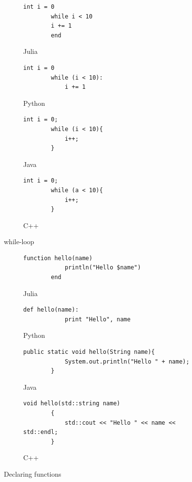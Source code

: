 \documentclass[a4paper, 11pt, titlepage]{article}
\begin{document}
\begin{figure}[H]
	\centering
	\begin{subfigure}[H]{0.7\textwidth}
		\centering
		\begin{lstlisting}[belowskip=0.5mm]
		int i = 0
		while i < 10
		i += 1
		end
		\end{lstlisting}
		\caption{Julia}
	\end{subfigure}
	\begin{subfigure}[H]{0.7\textwidth}
		\centering
		\begin{lstlisting}[belowskip=0.5mm]
		int i = 0
		while (i < 10):
			i += 1
		\end{lstlisting}
		\caption{Python}
	\end{subfigure}	
	\begin{subfigure}[H]{0.7\textwidth}
		\centering
		\begin{lstlisting}[belowskip=0.5mm]
		int i = 0;
		while (i < 10){
			i++;
		}
		\end{lstlisting}
		\caption{Java}
	\end{subfigure}
	\begin{subfigure}[H]{0.7\textwidth}
		\centering
		\begin{lstlisting}[belowskip=0.5mm]
		int i = 0;
		while (a < 10){
			i++;
		}
		\end{lstlisting}
		\caption{C++}
	\end{subfigure}
	\caption{while-loop}
	\label{whileloop}
\end{figure}

\begin{figure}[H]
	\centering
	\begin{subfigure}[H]{0.7\textwidth}
		\centering
		\begin{lstlisting}[belowskip=0.5mm]
		function hello(name)
			println("Hello $name")
		end
		\end{lstlisting}
		\caption{Julia}
	\end{subfigure}
	\begin{subfigure}[H]{0.7\textwidth}
		\centering
		\begin{lstlisting}[belowskip=0.5mm]
		def hello(name):
			print "Hello", name
		\end{lstlisting}
		\caption{Python}
	\end{subfigure}	
	\begin{subfigure}[H]{0.7\textwidth}
		\centering
		\begin{lstlisting}[belowskip=0.5mm]
		public static void hello(String name){
			System.out.println("Hello " + name);
		}
		\end{lstlisting}
		\caption{Java}
	\end{subfigure}
	\begin{subfigure}[H]{0.7\textwidth}
		\centering
		\begin{lstlisting}[belowskip=0.5mm]
		void hello(std::string name)
		{
			std::cout << "Hello " << name << std::endl;
		}
		\end{lstlisting}
		\caption{C++}
	\end{subfigure}
	\caption{Declaring functions}
	\label{function}
\end{figure}
\end{document}
